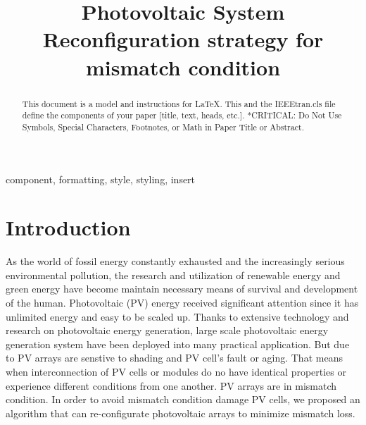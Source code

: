 \documentclass[conference]{IEEEtran}
\begin{document}
\title{Photovoltaic System Reconfiguration strategy for mismatch condition\\
{\footnotesize \textsuperscript{}}
}

\author{
\and
{}
\and
{}
}

\maketitle

\begin{abstract}
This document is a model and instructions for \LaTeX.
This and the IEEEtran.cls file define the components of your paper [title, text, heads, etc.]. *CRITICAL: Do Not Use Symbols, Special Characters, Footnotes, 
or Math in Paper Title or Abstract.
\end{abstract}

\begin{IEEEkeywords}
component, formatting, style, styling, insert
\end{IEEEkeywords}

\section{Introduction}

As the world of fossil energy constantly exhausted and the increasingly serious environmental pollution, the research and utilization of renewable energy and green energy have become maintain necessary means of survival and development of the human. Photovoltaic (PV) energy received significant attention since it has unlimited energy and easy to be scaled up. Thanks to extensive technology and research on photovoltaic energy generation, large scale photovoltaic energy generation system have been deployed into many practical application. But due to PV arrays are senstive to shading and PV cell's fault or aging. That means when interconnection of PV cells or modules do no have identical properties or experience different conditions from one another. PV arrays are in mismatch condition. In order to avoid mismatch condition damage PV cells, we proposed an algorithm that can re-configurate photovoltaic arrays to minimize mismatch loss.
\end{document}
